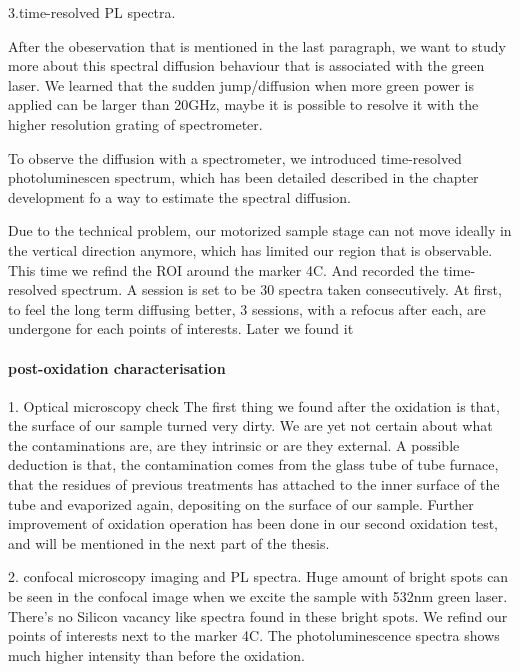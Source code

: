 3.time-resolved PL spectra.

After the obeservation that is mentioned in the last paragraph, we want to study more about this spectral diffusion behaviour that is associated with the green laser. We learned that the sudden jump/diffusion when more green power is applied can be larger than 20GHz, maybe it is possible to resolve it with the higher resolution grating of spectrometer. 

To observe the diffusion with a spectrometer, we introduced time-resolved photoluminescen spectrum, which has been detailed described in the chapter development fo a way to estimate the spectral diffusion.

Due to the technical problem, our motorized sample stage can not move ideally in the vertical direction anymore, which has limited our region that is observable. This time we refind the ROI around the marker 4C. And recorded the time-resolved spectrum. A session is set to be 30 spectra taken consecutively. At first, to feel the long term diffusing better, 3 sessions, with a refocus after each, are undergone for each points of interests. Later we found it 
\paragraph{post-oxidation characterisation}
1. Optical microscopy check
The first thing we found after the oxidation is that, the surface of our sample turned very dirty. We are yet not certain about what the contaminations are, are they intrinsic or are they external. A possible deduction is that, the contamination comes from the glass tube of tube furnace, that the residues of previous treatments has attached to the inner surface of the tube and evaporized again, depositing on the surface of our sample. Further improvement of oxidation operation has been done in our second oxidation test, and will be mentioned in the next part of the thesis.


2. confocal microscopy imaging and PL spectra.
Huge amount of bright spots can be seen in the confocal image when we excite the sample with 532nm green laser. There's no Silicon vacancy like spectra found in these bright spots. We refind our points of interests next to the marker 4C. The photoluminescence spectra shows much higher intensity than before the oxidation.


